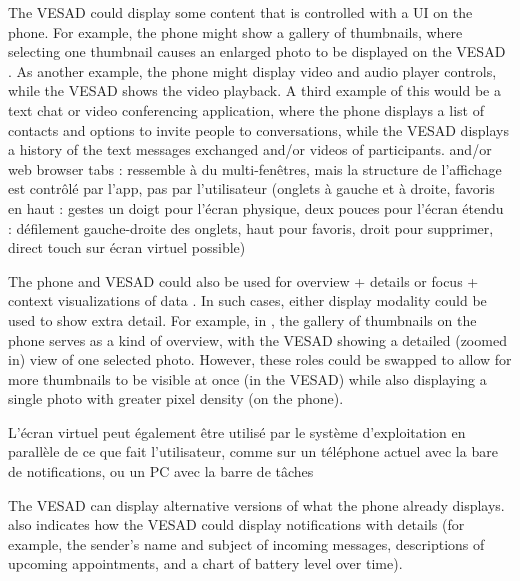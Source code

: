 The VESAD could display some content that is controlled with a UI on the phone. For example, the phone might show a gallery of thumbnails, where selecting one thumbnail causes an enlarged photo to be displayed on the VESAD . As another example, the phone might display video and audio player controls, while the VESAD shows the video playback. A third example of this would be a text chat or video conferencing application, where the phone displays a list of contacts and options to invite people to conversations, while the VESAD displays a history of the text messages exchanged and/or videos of participants.
and/or web browser tabs : ressemble à du multi-fenêtres, mais la structure de l'affichage est contrôlé par l'app, pas par l'utilisateur (onglets à gauche et à droite, favoris en haut : gestes un doigt pour l'écran physique, deux pouces pour l'écran étendu : défilement gauche-droite des onglets, haut pour favoris, droit pour supprimer, direct touch sur écran virtuel possible)

The phone and VESAD could also be used for overview + details or focus + context visualizations of data \cite{cockburn2009,burigat2013}. In such cases, either display modality could be used to show extra detail. For example, in , the gallery of thumbnails on the phone serves as a kind of overview, with the VESAD showing a detailed (zoomed in) view of one selected photo. However, these roles could be swapped to allow for more thumbnails to be visible at once (in the VESAD) while also displaying a single photo with greater pixel density (on the phone).


L'écran virtuel peut également être utilisé par le système d'exploitation en parallèle de ce que fait l'utilisateur, comme sur un téléphone actuel avec la bare de notifications, ou un PC avec la barre de tâches

The VESAD can display alternative versions of what the phone already displays.  also indicates how the VESAD could display notifications with details (for example, the sender's name and subject of incoming messages,
descriptions of upcoming appointments, and a chart of battery level over time).

